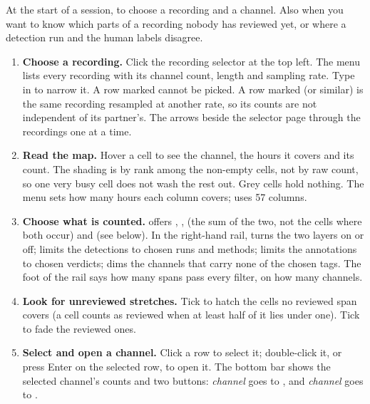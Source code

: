 At the start of a session, to choose a recording and a channel. Also when you want to know
which parts of a recording nobody has reviewed yet, or where a detection run and the human
labels disagree.


\begin{enumerate}
  \item \textbf{Choose a recording.} Click the recording selector at the top left. The menu
    lists every recording with its channel count, length and sampling rate. Type in
     to narrow it. A row marked  cannot be
    picked. A row marked  (or similar) is the same recording resampled at
    another rate, so its counts are not independent of its partner's. The arrows beside the
    selector page through the recordings one at a time.
  \item \textbf{Read the map.} Hover a cell to see the channel, the hours it covers and its
    count. The shading is by rank among the non-empty cells, not by raw count, so one very
    busy cell does not wash the rest out. Grey cells hold nothing. The  menu sets how
    many hours each column covers;  uses 57 columns.
  \item \textbf{Choose what is counted.}  offers ,
    ,  (the sum of the two, not the cells where
    both occur) and  (see below). In the right-hand rail,  turns the
    two layers on or off;  limits the detections to chosen runs and
    methods;  limits the annotations to chosen verdicts; 
    dims the channels that carry none of the chosen tags. The foot of the rail says how many
    spans pass every filter, on how many channels.
  \item \textbf{Look for unreviewed stretches.} Tick  to hatch the
    cells no reviewed span covers (a cell counts as reviewed when at least half of it lies
    under one). Tick  to fade the reviewed ones.
  \item \textbf{Select and open a channel.} Click a row to select it; double-click it, or
    press Enter on the selected row, to open it. The bottom bar shows the selected channel's
    counts and two buttons:  \emph{channel} goes to , and
     \emph{channel} goes to .
\end{enumerate}

